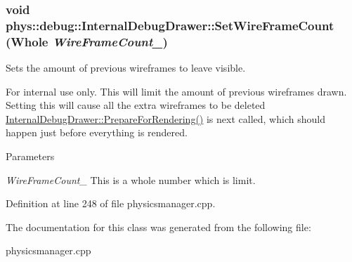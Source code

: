 \hypertarget{classphys_1_1debug_1_1InternalDebugDrawer_a76922fda7bb3b59d301e50d67e4f3c72}{
\subsubsection[{SetWireFrameCount}]{\setlength{\rightskip}{0pt plus 5cm}void phys::debug::InternalDebugDrawer::SetWireFrameCount ({\bf Whole} {\em WireFrameCount\_\-})}}
\label{db/d27/classphys_1_1debug_1_1InternalDebugDrawer_a76922fda7bb3b59d301e50d67e4f3c72}


Sets the amount of previous wireframes to leave visible. 

\begin{DoxyInternal}{For internal use only.}
This will limit the amount of previous wireframes drawn. Setting this will cause all the extra wireframes to be deleted \hyperlink{classphys_1_1debug_1_1InternalDebugDrawer_a1002293d223ca20e5bccc3c3412ce262}{InternalDebugDrawer::PrepareForRendering()} is next called, which should happen just before everything is rendered. 
\begin{DoxyParams}{Parameters}
\item[{\em WireFrameCount\_\-}]This is a whole number which is limit. \end{DoxyParams}
\end{DoxyInternal}


Definition at line 248 of file physicsmanager.cpp.



The documentation for this class was generated from the following file:\begin{DoxyCompactItemize}
\item 
physicsmanager.cpp\end{DoxyCompactItemize}
